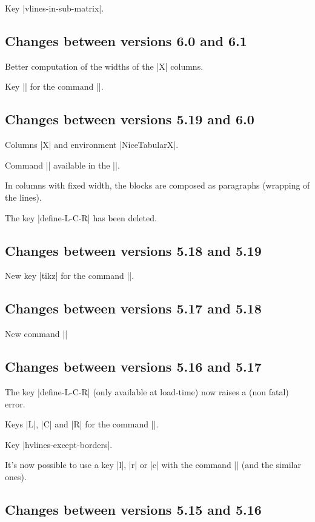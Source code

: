 \documentclass[dvipsnames]{article}%
\begin{document}
Key |vlines-in-sub-matrix|.

\subsection*{Changes between versions 6.0 and 6.1}

Better computation of the widths of the |X| columns.

Key |\color| for the command |\RowStyle|.

\subsection*{Changes between versions 5.19 and 6.0}

Columns |X| and environment |{NiceTabularX}|.

Command |\rowlistcolors| available in the |\CodeBefore|.

In columns with fixed width, the blocks are composed as paragraphs (wrapping
of the lines).

The key |define-L-C-R| has been deleted.

\subsection*{Changes between versions 5.18 and 5.19}

New key |tikz| for the command |\Block|.

\subsection*{Changes between versions 5.17 and 5.18}

New command |\RowStyle|

\subsection*{Changes between versions 5.16 and 5.17}

The key |define-L-C-R| (only available at load-time) now raises a (non fatal)
error.

Keys |L|, |C| and |R| for the command |\Block|.

Key |hvlines-except-borders|.

It's now possible to use a key |l|, |r| or |c| with the command
|\pAutoNiceMatrix| (and the similar ones).

\subsection*{Changes between versions 5.15 and 5.16}
\end{document}

